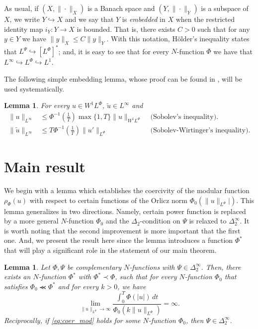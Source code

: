 \documentclass[twoside]{article}
\newtheorem{lem}[thm]{Lemma}
\theoremstyle{remark}
\newcommand{\orlnor}{\|_{L^{\Phi}}}
\newcommand{\lphi}{L^{\Phi}}
\newcommand{\lpsi}{L^{\Psi}}
\newcommand{\wphi}{W^{1}\lphi}
\newcommand{\sobnor}{\|_{W^{1}\lphi}}
\renewcommand{\leq}{\leqslant}
\begin{document}
As usual, if $(X,\|\cdot\|_X)$ is a Banach space and $(Y,\|\cdot \|_Y)$ is a subspace of $X$,  we write $Y\hookrightarrow X$ and we say that $Y$ is \emph{embedded} in $X$  when the restricted identity map $i_Y:Y\to X$ is bounded. That is, there exists $C>0$ such that  for any $y\in Y$ we have $\|y\|_X\leq C\|y\|_Y$.  With this notation, H\"older's inequality states that  $\lpsi\hookrightarrow  \left[\lphi\right]^*$; and, it is easy to see that for every $N$-function $\Phi$ we have that $L^{\infty}\hookrightarrow\lphi \hookrightarrow L^1$.




The following simple  embedding lemma, whose proof can be found in \cite{ABGMS2015}, will be used systematically.




\begin{lem}\label{inclusion orlicz} For every $u\in\wphi$, $\widetilde{u}\in L^{\infty}$ and
\begin{align}
 \|u\|_{L^{\infty}} &\leq\Phi^{-1}\left(\frac{1}{T}\right)\max\{1,T\}\|u\sobnor&\text{  (Sobolev's inequality).}\label{sobolev}\\
 \|\widetilde{u}\|_{L^{\infty}} &\leq T\Phi^{-1}\left(\frac{1}{T}\right)\|u'\orlnor&
\text{  (Sobolev-Wirtinger's inequality).}\label{wirtinger}
\end{align}

\end{lem}


\section{Main result}

We begin with a lemma which establishes the coercivity of the modular function $\rho_{\Phi}(u)$ with respect to certain functions of the Orlicz norm $\Phi_0(\|u\orlnor|)$. This lemma generalizes \cite[Lemma 5.2]{ABGMS2015} in two directions. 
Namely, certain power function is replaced by a more general $N$-function $\Phi_0$ and 
the $\Delta_2$-condition  on $\Psi$ is relaxed to $\Delta_2^{\infty}$. 
It is worth noting that the second improvement is more important that the first one.
And, we present the result here since the lemma introduces a function $\Phi^*$ that will play a significant role in the statement of our main theorem.

\begin{lem}\label{lem_coer}
Let $\Phi,\Psi$ be complementary $N$-functions with $\Psi \in \Delta_2^{\infty}$. Then, 
there exists an $N$-function $\Phi^*$ with $\Phi^*\prec\Phi$, 
such that  for every $N$-function $\Phi_0$ that satisfies $\Phi_0\llcurly\Phi^*$ and for every $k>0$, we have
\begin{equation}\label{eq:coer_mod}
\lim\limits_{\|u\orlnor\to \infty}
\frac{\int_0^T \Phi(|u|)\,dt}{\Phi_0(k\|u\orlnor)}=\infty.
\end{equation}
Reciprocally, if  \eqref{eq:coer_mod} holds for some $N$-function $\Phi_0$,  then $\Psi\in\Delta_2^{\infty}$.
\end{lem}
\end{document}
